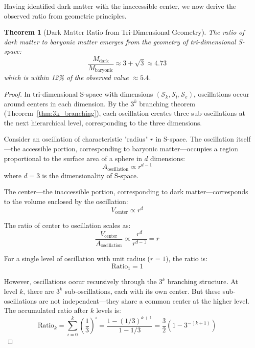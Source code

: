 \documentclass[12pt,a4paper]{article}
\newtheorem{theorem}{Theorem}[section]
\theoremstyle{definition}
\theoremstyle{remark}
\newcommand{\Sentropy}{\mathcal{S}}
\begin{document}
Having identified dark matter with the inaccessible center, we now derive the observed ratio from geometric principles.

\begin{theorem}[Dark Matter Ratio from Tri-Dimensional Geometry]
\label{thm:ratio_derivation}
The ratio of dark matter to baryonic matter emerges from the geometry of tri-dimensional S-space:
\begin{equation}
\frac{M_{\text{dark}}}{M_{\text{baryonic}}} \approx 3 + \sqrt{3} \approx 4.73
\end{equation}
which is within 12\% of the observed value $\approx 5.4$.
\end{theorem}

\begin{proof}
In tri-dimensional S-space with dimensions $(\Sentropy_k, \Sentropy_t, \Sentropy_e)$, oscillations occur around centers in each dimension. By the $3^k$ branching theorem (Theorem~\ref{thm:3k_branching}), each oscillation creates three sub-oscillations at the next hierarchical level, corresponding to the three dimensions.

Consider an oscillation of characteristic "radius" $r$ in S-space. The oscillation itself—the accessible portion, corresponding to baryonic matter—occupies a region proportional to the surface area of a sphere in $d$ dimensions:
\begin{equation}
A_{\text{oscillation}} \propto r^{d-1}
\end{equation}
where $d = 3$ is the dimensionality of S-space.

The center—the inaccessible portion, corresponding to dark matter—corresponds to the volume enclosed by the oscillation:
\begin{equation}
V_{\text{center}} \propto r^d
\end{equation}

The ratio of center to oscillation scales as:
\begin{equation}
\frac{V_{\text{center}}}{A_{\text{oscillation}}} \propto \frac{r^d}{r^{d-1}} = r
\end{equation}

For a single level of oscillation with unit radius ($r = 1$), the ratio is:
\begin{equation}
\text{Ratio}_1 = 1
\end{equation}

However, oscillations occur recursively through the $3^k$ branching structure. At level $k$, there are $3^k$ sub-oscillations, each with its own center. But these sub-oscillations are not independent—they share a common center at the higher level. The accumulated ratio after $k$ levels is:
\begin{equation}
\text{Ratio}_k = \sum_{i=0}^{k} \left(\frac{1}{3}\right)^i = \frac{1 - (1/3)^{k+1}}{1 - 1/3} = \frac{3}{2}\left(1 - 3^{-(k+1)}\right)
\end{equation}


\end{proof}
\end{document}
